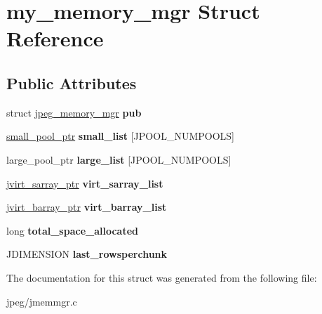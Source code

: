 \hypertarget{structmy__memory__mgr}{}\section{my\+\_\+memory\+\_\+mgr Struct Reference}
\label{structmy__memory__mgr}
\subsection*{Public Attributes}
\begin{DoxyCompactItemize}
\item 
struct \hyperlink{structjpeg__memory__mgr}{jpeg\+\_\+memory\+\_\+mgr} {\bfseries pub}\hypertarget{structmy__memory__mgr_a692dd77bfba8ab81c4f42643254d4528}{}\label{structmy__memory__mgr_a692dd77bfba8ab81c4f42643254d4528}

\item 
\hyperlink{unionsmall__pool__struct}{small\+\_\+pool\+\_\+ptr} {\bfseries small\+\_\+list} \mbox{[}J\+P\+O\+O\+L\+\_\+\+N\+U\+M\+P\+O\+O\+LS\mbox{]}\hypertarget{structmy__memory__mgr_a1c2bfaa346643520a2ff682c38e4ce0d}{}\label{structmy__memory__mgr_a1c2bfaa346643520a2ff682c38e4ce0d}

\item 
large\+\_\+pool\+\_\+ptr {\bfseries large\+\_\+list} \mbox{[}J\+P\+O\+O\+L\+\_\+\+N\+U\+M\+P\+O\+O\+LS\mbox{]}\hypertarget{structmy__memory__mgr_af8257908eac43538230773374417739b}{}\label{structmy__memory__mgr_af8257908eac43538230773374417739b}

\item 
\hyperlink{structjvirt__sarray__control}{jvirt\+\_\+sarray\+\_\+ptr} {\bfseries virt\+\_\+sarray\+\_\+list}\hypertarget{structmy__memory__mgr_ad613a2a2e52ac069c63fd083c9c91f04}{}\label{structmy__memory__mgr_ad613a2a2e52ac069c63fd083c9c91f04}

\item 
\hyperlink{structjvirt__barray__control}{jvirt\+\_\+barray\+\_\+ptr} {\bfseries virt\+\_\+barray\+\_\+list}\hypertarget{structmy__memory__mgr_a09b8c66f15f14f1c3c247d98d6c81bbc}{}\label{structmy__memory__mgr_a09b8c66f15f14f1c3c247d98d6c81bbc}

\item 
long {\bfseries total\+\_\+space\+\_\+allocated}\hypertarget{structmy__memory__mgr_acfcdee3e2d3e3d168e2a2aebe081535f}{}\label{structmy__memory__mgr_acfcdee3e2d3e3d168e2a2aebe081535f}

\item 
J\+D\+I\+M\+E\+N\+S\+I\+ON {\bfseries last\+\_\+rowsperchunk}\hypertarget{structmy__memory__mgr_a7e30eb574b588f102f07d0ddb94d177d}{}\label{structmy__memory__mgr_a7e30eb574b588f102f07d0ddb94d177d}

\end{DoxyCompactItemize}


The documentation for this struct was generated from the following file\+:\begin{DoxyCompactItemize}
\item 
jpeg/jmemmgr.\+c\end{DoxyCompactItemize}
